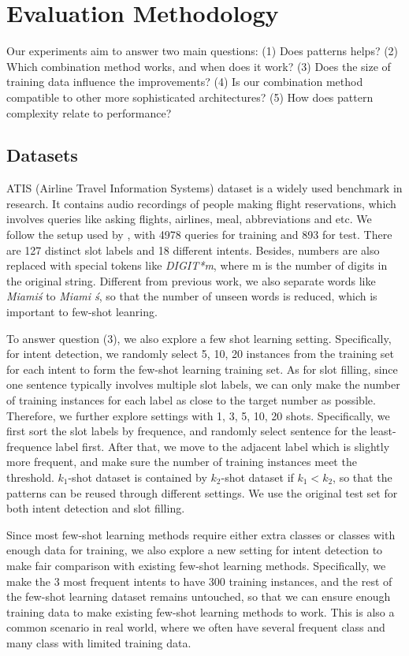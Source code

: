 \section{Evaluation Methodology}
Our experiments aim to answer two main questions: (1) Does \RE patterns helps? (2) Which combination method works, and when does it work? (3) Does the size of training data influence the improvements? (4) Is our combination method compatible to other more sophisticated \NN architectures? (5) How does pattern complexity relate to performance?

\subsection{Datasets}
ATIS (Airline Travel Information Systems) dataset \cite{hemphill1990atis} is a widely used benchmark in \NLU research. It contains audio recordings of people making flight reservations, which involves queries like asking flights, airlines, meal, abbreviations and etc. We follow the setup used by \cite{liu2016attention}, with 4978 queries for training and 893 for test. There are 127 distinct slot labels and 18 different intents. Besides, numbers are also replaced with special tokens like \emph{DIGIT*m}, where m is the number of digits in the original string. Different from previous work, we also separate words like \emph{Miami\'s} to \emph{Miami \'s}, so that the number of unseen words is reduced, which is important to few-shot leanring.

To answer question (3), we also explore a few shot learning setting. Specifically, for intent detection, we randomly select 5, 10, 20 instances from the training set for each intent to form the few-shot learning training set. As for slot filling, since one sentence typically involves multiple slot labels, we can only make the number of training instances for each label as close to the target number as possible. Therefore, we further explore settings with 1, 3, 5, 10, 20 shots. Specifically, we first sort the slot labels by frequence, and randomly select sentence for the least-frequence label first. After that, we move to the adjacent label which is slightly more frequent, and make sure the number of training instances meet the threshold. $k_1$-shot dataset is contained by $k_2$-shot dataset if $k_1 < k_2$, so that the \RE patterns can be reused through different settings. We use the original test set for both intent detection and slot filling.

Since most few-shot learning methods require either extra classes or classes with enough data for training, we also explore a new setting for intent detection to make fair comparison with existing few-shot learning methods. Specifically, we make the 3 most frequent intents to have 300 training instances, and the rest of the few-shot learning dataset remains untouched, so that we can ensure enough training data to make existing few-shot learning methods to work. This is also a common scenario in real world, where we often have several frequent class and many class with limited training data.

